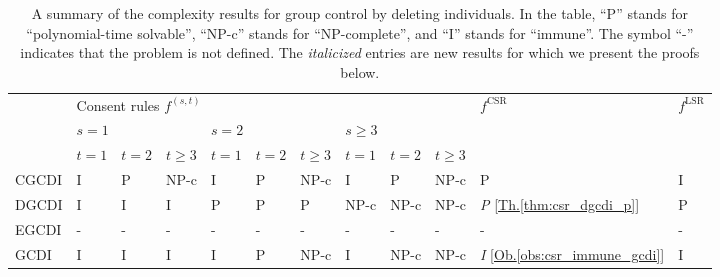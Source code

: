 \documentclass[
    12pt,               %
    a4paper,            %
    bibtotoc,           %
    pointlessnumbers,   %
    ngerman,            %
    titlepage,          %
    leqno,              %
    ]{scrarticle}       %
\newcommand\ttref[1]{[\hyperref[#1]{Th.\thinspace\ref*{#1}}]}
\newcommand\ooref[1]{[\hyperref[#1]{Ob.\thinspace\ref*{#1}}]}
\begin{document}
\begin{table}[!htb]
\begin{tabularx}{\textwidth}{
p{}
X
X
X
X
X
X
X
X
X
p{}
X
}
\hline & \multicolumn{9}{l}{Consent rules $f^{(s, t)}$} & $f^{\text{CSR}}$ & $f^{\text{LSR}}$ \\
\cline { 2 - 10 } & \multicolumn{3}{l}{$s=1$} & \multicolumn{3}{l}{$s=2$} & \multicolumn{3}{l}{$s \geq 3$} & & \\
\cline { 2 - 10 } & $t=1$ & $t=2$ & $t \geq 3$ & $t=1$ & $t=2$ & $t \geq 3$ & $t=1$ & $t=2$ & $t \geq 3$ & & \\
\hline

\multicolumn{1}{p{0.092\textwidth}|}{CGCDI} &
I &
P &
\multicolumn{1}{X|}{NP-c} &
I &
P &
\multicolumn{1}{X|}{NP-c} &
I &
P &
\multicolumn{1}{X|}{NP-c} &
P &
I \\

\multicolumn{1}{p{0.092\textwidth}|}{DGCDI} &
I &
I &
\multicolumn{1}{X|}{I} &
P &
P &
\multicolumn{1}{X|}{P} &
NP-c &
NP-c &
\multicolumn{1}{X|}{NP-c} &
\textit{P} \ttref{thm:csr_dgcdi_p} &
P \\

\multicolumn{1}{p{0.092\textwidth}|}{EGCDI} &
- &
- &
\multicolumn{1}{X|}{-} &
- &
- &
\multicolumn{1}{X|}{-} &
- &
- &
\multicolumn{1}{X|}{-} &
- &
- \\

\multicolumn{1}{p{0.092\textwidth}|}{GCDI} &
I &
I &
\multicolumn{1}{X|}{I} &
I &
P &
\multicolumn{1}{X|}{NP-c} &
I &
NP-c &
\multicolumn{1}{X|}{NP-c} &
\textit{I} \ooref{obs:csr_immune_gcdi} &
I \\

\hline
\end{tabularx}
\caption{
A summary of the complexity results for group control by deleting individuals.
In the table, ``P'' stands for ``polynomial-time solvable'', ``NP-c'' stands for ``NP-complete'', and ``I'' stands for ``immune''. The symbol ``-'' indicates that the problem is not defined.
The \textit{italicized} entries are new results for which we present the proofs below.
}
\label{tab:group_control_deleting}
\end{table}
\end{document}
